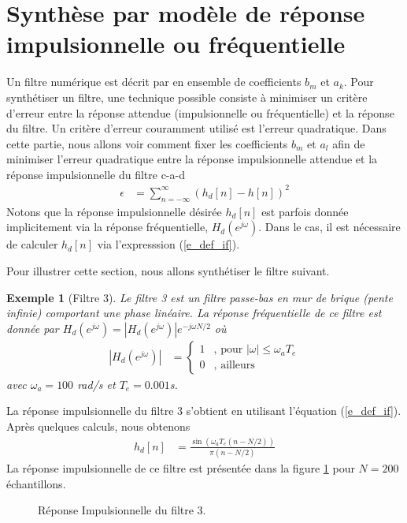 \documentclass[11pt,a4paper]{IEEEtran}
\newtheorem*{exemple}{Exemple}
\begin{document}
\section{Synthèse par modèle de réponse impulsionnelle ou fréquentielle}
\label{s_design_ri}
Un filtre numérique est décrit par en ensemble de coefficients $b_m$ et $a_k$. Pour synthétiser un filtre, une technique possible consiste à minimiser un critère d'erreur entre la réponse attendue (impulsionnelle ou fréquentielle) et la réponse du filtre. Un critère d'erreur couramment utilisé est l'erreur quadratique. Dans cette partie, nous allons voir comment fixer les coefficients $b_m$ et $a_l$ afin de minimiser l'erreur quadratique entre la réponse impulsionnelle attendue et la réponse impulsionnelle du filtre c-a-d
\begin{align}
\epsilon&=\sum_{n=-\infty}^{\infty}(h_d[n]-h[n])^2\label{eq_ref_h}
\end{align}
Notons que la réponse impulsionnelle désirée $h_d[n]$ est parfois donnée implicitement via la réponse fréquentielle, $H_d(e^{j\omega})$. Dans le cas, il est nécessaire de calculer $h_d[n]$ via l'expresssion (\ref{e_def_if}).

Pour illustrer cette section, nous allons synthétiser le filtre suivant.
\begin{exemple}[Filtre 3]
Le filtre 3 est un filtre passe-bas en mur de brique (pente infinie) comportant une phase linéaire. La réponse fréquentielle de ce filtre est donnée par $H_d(e^{j\omega})=|H_d(e^{j\omega})|e^{-j\omega N/2}$ où
\begin{align}
|H_d(e^{j\omega})|&=\left\{\begin{array}{cl}
1&\textrm{, pour } |\omega| \le \omega_a T_e\\
0 &\textrm{, ailleurs}\end{array}\right.
\end{align}
avec $\omega_a=100$ rad/s et $T_e=0.001$s.
\end{exemple}
La réponse impulsionnelle du filtre 3 s'obtient en utilisant l'équation (\ref{e_def_if}). Après quelques calculs, nous obtenons
\begin{align}
h_d[n]&=\frac{\sin\left(\omega_a T_e (n-N/2)\right)}{\pi (n-N/2)}
\end{align}
La réponse impulsionnelle de ce filtre est présentée dans la figure \ref{fig_fir_ri} pour $N=200$ échantillons.
\begin{figure}[t]
\centering
{}
\caption{Réponse Impulsionnelle du filtre 3.}\label{fig_fir_ri}
\end{figure}
\end{document}
